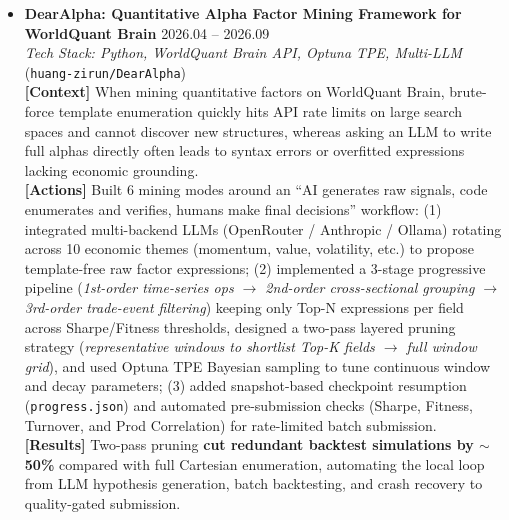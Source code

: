 \documentclass[10pt,letterpaper]{article}
\begin{document}
\begin{itemize}[leftmargin=10pt]
  \item \textbf{DearAlpha: Quantitative Alpha Factor Mining Framework for WorldQuant Brain} \hfill 2026.04 -- 2026.09 \\
  \emph{Tech Stack: Python, WorldQuant Brain API, Optuna TPE, Multi-LLM} (\texttt{huang-zirun/DearAlpha}) \\
  \textbf{[Context]} When mining quantitative factors on WorldQuant Brain, brute-force template enumeration quickly hits API rate limits on large search spaces and cannot discover new structures, whereas asking an LLM to write full alphas directly often leads to syntax errors or overfitted expressions lacking economic grounding. \\
  \textbf{[Actions]} Built 6 mining modes around an ``AI generates raw signals, code enumerates and verifies, humans make final decisions'' workflow: (1) integrated multi-backend LLMs (OpenRouter / Anthropic / Ollama) rotating across 10 economic themes (momentum, value, volatility, etc.) to propose template-free raw factor expressions; (2) implemented a 3-stage progressive pipeline (\emph{1st-order time-series ops $\rightarrow$ 2nd-order cross-sectional grouping $\rightarrow$ 3rd-order trade-event filtering}) keeping only Top-N expressions per field across Sharpe/Fitness thresholds, designed a two-pass layered pruning strategy (\emph{representative windows to shortlist Top-K fields $\rightarrow$ full window grid}), and used Optuna TPE Bayesian sampling to tune continuous window and decay parameters; (3) added snapshot-based checkpoint resumption (\texttt{progress.json}) and automated pre-submission checks (Sharpe, Fitness, Turnover, and Prod Correlation) for rate-limited batch submission. \\
  \textbf{[Results]} Two-pass pruning \textbf{cut redundant backtest simulations by $\sim$50\%} compared with full Cartesian enumeration, automating the local loop from LLM hypothesis generation, batch backtesting, and crash recovery to quality-gated submission.


\end{itemize}
\end{document}

